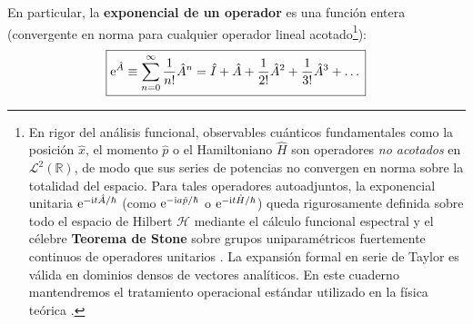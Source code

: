 En particular, la \textbf{exponencial de un operador} es una función entera (convergente en norma para cualquier operador lineal acotado\footnote{En rigor del análisis funcional, observables cuánticos fundamentales como la posición $\hat{x}$, el momento $\hat{p}$ o el Hamiltoniano $\hat{H}$ son operadores \textit{no acotados} en $\mathcal{L}^2(\mathbb{R})$, de modo que sus series de potencias no convergen en norma sobre la totalidad del espacio. Para tales operadores autoadjuntos, la exponencial unitaria $\mathrm{e}^{-\mathrm{i} t\hat{A}/\hbar}$ (como $\mathrm{e}^{-\mathrm{i} a\hat{p}/\hbar}$ o $\mathrm{e}^{-\mathrm{i} t\hat{H}/\hbar}$) queda rigurosamente definida sobre todo el espacio de Hilbert $\mathcal{H}$ mediante el cálculo funcional espectral y el célebre \textbf{Teorema de Stone} sobre grupos uniparamétricos fuertemente continuos de operadores unitarios \cite{ballentine}. La expansión formal en serie de Taylor es válida en dominios densos de vectores analíticos. En este cuaderno mantendremos el tratamiento operacional estándar utilizado en la física teórica \cite{sakurai, zettili}.}):
\begin{equation}
    \boxed{\mathrm{e}^{\hat{A}} \equiv \sum_{n=0}^\infty \frac{1}{n!} \hat{A}^n = \hat{I} + \hat{A} + \frac{1}{2!}\hat{A}^2 + \frac{1}{3!}\hat{A}^3 + \dots}
    \label{eq:operator_exponential}
\end{equation}

